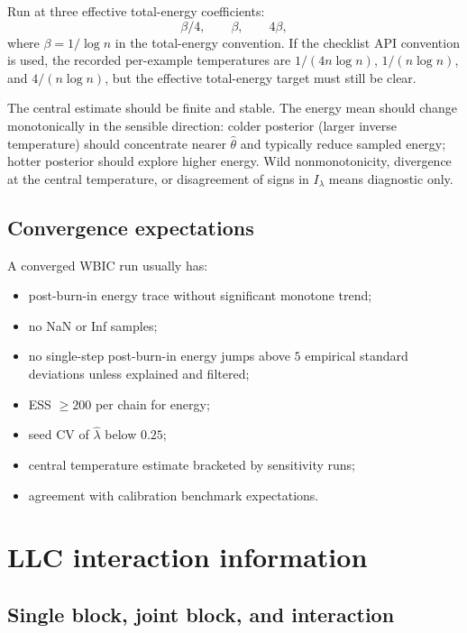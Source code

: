 \documentclass[11pt]{article}
\begin{document}
Run at three effective total-energy coefficients:
\begin{equation}
  \beta/4,\qquad \beta,\qquad 4\beta,
\end{equation}
where $\beta=1/\log n$ in the total-energy convention.  If the checklist API convention is used, the recorded per-example temperatures are $1/(4n\log n)$, $1/(n\log n)$, and $4/(n\log n)$, but the effective total-energy target must still be clear.

The central estimate should be finite and stable.  The energy mean should change monotonically in the sensible direction: colder posterior (larger inverse temperature) should concentrate nearer $\hat\theta$ and typically reduce sampled energy; hotter posterior should explore higher energy.  Wild nonmonotonicity, divergence at the central temperature, or disagreement of signs in $I_\lambda$ means diagnostic only.

\subsection{Convergence expectations}

A converged WBIC run usually has:
\begin{itemize}
\item post-burn-in energy trace without significant monotone trend;
\item no NaN or Inf samples;
\item no single-step post-burn-in energy jumps above $5$ empirical standard deviations unless explained and filtered;
\item ESS $\geq 200$ per chain for energy;
\item seed CV of $\hat\lambda$ below $0.25$;
\item central temperature estimate bracketed by sensitivity runs;
\item agreement with calibration benchmark expectations.
\end{itemize}

\section{LLC interaction information}

\subsection{Single block, joint block, and interaction}
\end{document}
